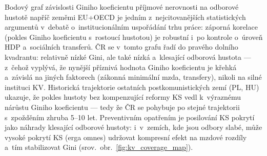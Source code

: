 Bodový graf závislosti Giniho koeficientu příjmové nerovnosti na odborové hustotě napříč zeměmi \ac{EU}+OECD je jedním z~nejcitovanějších statistických argumentů v~debatě o~institucionálním uspořádání trhu práce: záporná korelace (pokles Giniho koeficientu s~rostoucí hustotou) je robustní i~po kontrole o~úroveň \ac{HDP} a~sociálních transferů.
ČR se v~tomto grafu řadí do pravého dolního kvadrantu: relativně nízké Gini, ale také nízká a~klesající odborová hustota --- z~čehož vyplývá, že nynější příznivá hodnota Giniho koeficientu je křehká a~závislá na jiných faktorech (zákonná minimální mzda, transfery), nikoli na silné instituci \ac{KV}.
Historická trajektorie ostatních postkomunistických zemí (PL, HU) ukazuje, že pokles hustoty bez kompenzující reformy \ac{KS} vedl k~výraznému nárůstu Giniho koeficientu --- tedy že ČR se pohybuje po stejné trajektorii s~zpožděním zhruba 5--10 let.
Preventivním opatřením je posilování \ac{KS} pokrytí jako náhrady klesající odborové hustoty: i~v~zemích, kde jsou odbory slabé, může vysoké pokrytí \ac{KS} (erga omnes) udržovat kompresní efekt na mzdové rozdíly a~tím stabilizovat Gini (srov.~obr.~\ref{fig:kv_coverage_map}).


